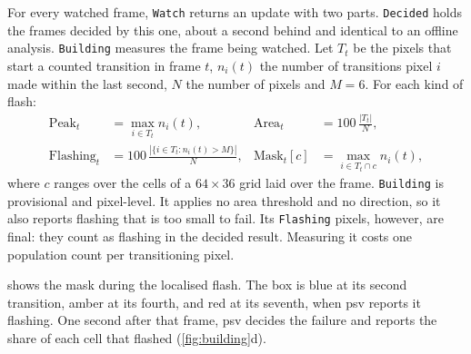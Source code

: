 \documentclass[11pt,a4paper]{article}
\newcommand{\psv}{\textsf{psv}}
\newcommand{\code}[1]{\texttt{#1}}
\begin{document}
For every watched frame, \code{Watch} returns an update with two parts. \code{Decided} holds the frames decided by this one, about a second behind and identical to an offline analysis. \code{Building} measures the frame being watched. Let $T_t$ be the pixels that start a counted transition in frame $t$, $n_i(t)$ the number of transitions pixel $i$ made within the last second, $N$ the number of pixels and $M=6$. For each kind of flash:
\begin{align}
  \text{Peak}_t &= \max_{i\in T_t} n_i(t), &
  \text{Area}_t &= 100\,\frac{|T_t|}{N}, \\
  \text{Flashing}_t &= 100\,\frac{|\{i\in T_t : n_i(t) > M\}|}{N}, &
  \text{Mask}_t[c] &= \max_{i\in T_t\cap c} n_i(t),
\end{align}
where $c$ ranges over the cells of a $64\times36$ grid laid over the frame. \code{Building} is provisional and pixel-level. It applies no area threshold and no direction, so it also reports flashing that is too small to fail. Its \code{Flashing} pixels, however, are final: they count as flashing in the decided result. Measuring it costs one population count per transitioning pixel.

 shows the mask during the localised flash. The box is blue at its second transition, amber at its fourth, and red at its seventh, when \psv{} reports it flashing. One second after that frame, \psv{} decides the failure and reports the share of each cell that flashed (\cref{fig:building}d).
\end{document}
